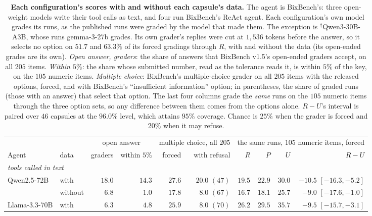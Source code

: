 \documentclass{article}
\begin{document}
\begin{table}[htbp]
\centering\footnotesize\setlength{\tabcolsep}{2.3pt}
\caption{\textbf{Each configuration's scores with and without each capsule's data.} The agent is BixBench's:
three open-weight models write their tool calls as text, and four run BixBench's ReAct agent. Each configuration's own
model grades its runs, as the published runs were graded by the model that made them. The exception is
$^\dagger$Qwen3-30B-A3B, whose runs gemma-3-27b grades. Its own grader's replies were cut at $1{,}536$ tokens before
the answer, so it selects no option on $51.7$ and $63.3\%$ of its forced gradings through $R$, with and without the
data (its open-ended grades are its own). \emph{Open answer, graders}: the share of answers that BixBench v1.5's
open-ended graders accept, on all $205$ items. \emph{Within $5\%$}: the share whose submitted number, read as the
tolerance reads it, is within $5\%$ of the key, on the $105$ numeric items. \emph{Multiple choice}: BixBench's
multiple-choice grader on all $205$ items with the released options, forced, and with BixBench's ``insufficient
information'' option; in parentheses, the share of graded runs (those with an answer) that select that option. The
last four columns grade the \emph{same} runs on the $105$ numeric items through the three option sets, so any
difference between them comes from the options alone. $R-U$'s interval is paired over $46$ capsules at the $96.0\%$
level, which attains $95\%$ coverage. Chance is $25\%$ when the grader is forced and $20\%$ when it may refuse.}
\label{tab:withdata}
\begin{tabular}{llrrrrrrrr}
\toprule
& & \multicolumn{2}{c}{open answer} & \multicolumn{2}{c}{multiple choice, all $205$} &
\multicolumn{4}{c}{the same runs, $105$ numeric items, forced}\\
\cmidrule(lr){3-4}\cmidrule(lr){5-6}\cmidrule(lr){7-10}
Agent & data & graders & within $5\%$ & forced & with refusal & $R$ & $P$ & $U$ & $R-U$\\
\midrule
\multicolumn{10}{l}{\emph{tools called in text}}\\
Qwen2.5-72B & with & $18.0$ & $14.3$ & $27.6$ & $20.0$ $(47)$ & $19.5$ & $22.9$ & $30.0$ & $-10.5$ $[-16.3,-5.2]$\\
 & without & $6.8$ & $1.0$ & $17.8$ & $8.0$ $(67)$ & $16.7$ & $18.1$ & $25.7$ & $-9.0$ $[-17.6,-1.0]$\\
Llama-3.3-70B & with & $6.3$ & $4.8$ & $25.9$ & $8.0$ $(70)$ & $26.2$ & $29.5$ & $35.7$ & $-9.5$ $[-15.7,-3.1]$\\

\end{tabular}
\end{table}
\end{document}
